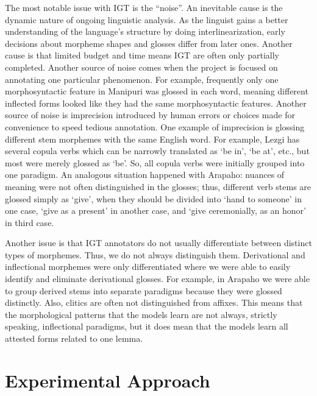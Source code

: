 The most notable issue with IGT is the ``noise''. An inevitable cause is the dynamic nature of ongoing linguistic analysis. As the linguist gains a better understanding of the language's structure by doing interlinearization, early decisions about morpheme shapes and glosses differ from later ones. Another cause is that limited budget and time means IGT are often only partially completed. Another source of noise comes when the project is focused on annotating one particular phenomenon. For example, frequently only one morphosyntactic feature in Manipuri was glossed in each word, meaning different inflected forms looked like they had the same morphosyntactic features. Another source of noise is imprecision introduced by human errors or choices made for convenience to speed tedious annotation. One example of imprecision is glossing different stem morphemes with the same English word. For example, Lezgi has several copula verbs which can be narrowly translated as `be in', `be at', etc., but most were merely glossed as `be'. So, all copula verbs were initially grouped into one paradigm. An analogous situation happened with Arapaho: nuances of meaning were not often distinguished in the glosses; thus, different verb stems are glossed simply as ‘give’, when they should be divided into ‘hand to someone’ in one case, ‘give as a present’ in another case, and ‘give ceremonially, as an honor’ in third case.

Another issue is that IGT annotators do not usually differentiate between distinct types of morphemes. Thus, we do not always distinguish them. Derivational and inflectional morphemes were only differentiated where we were able to easily identify and eliminate derivational glosses. For example, in Arapaho we were able to group derived stems into separate paradigms because they were glossed distinctly. Also, clitics are often not distinguished from affixes. This means that the morphological patterns that the models learn are not always, strictly speaking, inflectional paradigms, but it does mean that the models learn all attested forms related to one lemma.


\section{Experimental Approach}

